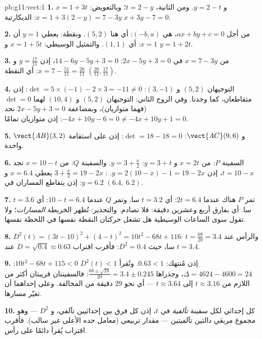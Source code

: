\begin{solution}{pb:g11:vect:1}
\textbf{1.} $x = 1 + 3t$ و $y = 2 - t$. ومن الثانية،
$t = 2 - y$؛ وبالتعويض: $x = 1 + 3(2 - y) = 7 - 3y$:
 الديكارتية $x + 3y - 7 = 0$.

\textbf{2.} من أجل $ax + by + c = 0$،  هي
$(-b, a)$: أي هنا $(5, 2)$. ونقطة: يعطي $y = 1$ أن $x = 1$:
أي $(1, 1)$. والتمثيل الوسيطي: $x = 1 + 5t$ و $y = 1 + 2t$.

\textbf{3.} من $x = 7 - 3y$ في $2x - 5y + 3 = 0$:
$14 - 6y - 5y + 3 = 0$، إذن $y = \frac{17}{11}$ و
$x = 7 - \frac{51}{11} = \frac{26}{11}$: أي النقطة
$\left(\frac{26}{11}, \frac{17}{11}\right)$.

\textbf{4.} التوجيهان $(5, 2)$ و $(3, -1)$:
$\det = 5 \times (-1) - 2 \times 3 = -11 \neq 0$: إذن متقاطعان،
كما وجدنا. وفي الزوج الثاني: التوجيهان $(5, 2)$ و
$(10, 4)$ لهما $\det = 0$ (فهما متوازيان)، وبمضاعفة
$2x - 5y + 3 = 0$ نجد $-4x + 10y - 6 = 0 \neq -4x + 10y + 1
= 0$: إذن متوازيان تمامًا.

\textbf{5.} $\vect{AB}(3, 2)$ و $\vect{AC}(9, 6)$:
$\det = 18 - 18 = 0$: إذن على استقامة واحدة.

\textbf{6.} السفينة $P$: من $x = 2t$ و $y = 3 + t$: $y = 3 +
\frac x2$. والسفينة $Q$: من $x = 10 - t$ نجد $t = 10 - x$، إذن
$y = 2(10 - x) - 1 = 19 - 2x$. :
$3 + \frac x2 = 19 - 2x$ يعطي $x = 6.4$ و $y = 6.2$: إذن يتقاطع المساران
في $(6.4,\ 6.2)$.

\textbf{7.} تمر $P$ هناك عندما $2t = 6.4$: أي $t = 3.2$ سا. وتمر $Q$
عندما $10 - t = 6.4$: أي $t = 3.6$ سا. أي بفارق أربع وعشرين دقيقة: فلا
تصادم. والتحذير: تُظهر الخريطة \emph{المسارات}؛ ولا تقول
سوى الساعات الوسيطية هل تشغل حركتان النقطة نفسها
في اللحظة نفسها.

\textbf{8.} $D^2(t) = (3t - 10)^2 + (4 - t)^2 =
10t^2 - 68t + 116$: والرأس عند $t = \frac{68}{20} = 3.4$ سا،
حيث $D^2 = 0.4$: فأقرب اقتراب
$D = \sqrt{0.4} \approx 0.63$  عند $t = 3.4$.

\textbf{9.} إذن مُنتهك: $0.63 < 1$. وتُقرأ $D^2(t) < 1$
$10t^2 - 68t + 115 < 0$: $\Delta = 4624 - 4600 = 24$، وجذراها
$\frac{68 \pm \sqrt{24}}{20} = 3.4 \pm 0.245$: فالسفينتان
قريبتان أكثر من اللازم من $t \approx 3.16$ إلى $t \approx 3.64$ --- أي نحو
$29$ دقيقة من المخالفة. وعلى إحداهما أن تغيّر مسارها.

\textbf{10.} كل إحداثي لكل سفينة  \emph{تآلفية}
في $t$، إذن كل فرق بين إحداثيين تآلفي،
و $D^2$ --- وهو مجموع مربعَي دالتين تآلفيتين --- مقدار
تربيعي (معامل حده الأعلى غير سالب). فأقرب
اقتراب يُقرأ دائمًا على رأس.


\end{solution}
